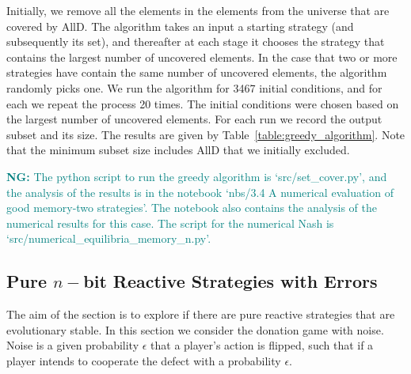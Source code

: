 \documentclass{article}
\theoremstyle{definition}
\newcommand{\nikoleta}[1]{\textcolor{teal}{{\bf NG:} #1}}
\begin{document}
Initially, we remove all the elements in the elements from the universe that are
covered by AllD. The algorithm takes an input a starting strategy (and
subsequently its set), and thereafter at each stage it chooses the strategy that
contains the largest number of uncovered elements. In the case that two or more
strategies have contain the same number of uncovered elements, the algorithm
randomly picks one. We run the algorithm for 3467 initial conditions, and for
each we repeat the process 20 times. The initial conditions were chosen based on
the largest number of uncovered elements. For each run we record the output
subset and its size. The results are given by
Table~\ref{table:greedy_algorithm}. Note that the minimum subset size includes
AllD that we initially excluded.

\begin{table}[htbp]
  \centering
\caption{\textbf{Results of greedy algorithm.} The greedy algorithm was used to
find the smallest possible subset of pure memory-two strategies that can
constrain the space of Nash in the case of memory-two strategies. Based on the
approximate solution, the smallest subset is of size
11.}\label{table:greedy_algorithm}
\end{table}

\nikoleta{The python script to run the greedy algorithm is `src/set\_cover.py',
and the analysis of the results is in the
notebook `nbs/3.4 A numerical evaluation of good memory-two strategies'.
The notebook also contains the analysis of the numerical results for this case.
The script for the numerical Nash is `src/numerical\_equilibria\_memory\_n.py'.}

\subsection{Pure \(n-\)bit Reactive Strategies with Errors}\label{section:pure_strategies}

The aim of the section is to explore if there are pure reactive strategies that
are evolutionary stable. In this section we consider the donation game with
noise. Noise is a given probability \(\epsilon\) that a player's action is
flipped, such that if a player intends to cooperate the defect with a
probability \(\epsilon\).
\end{document}
